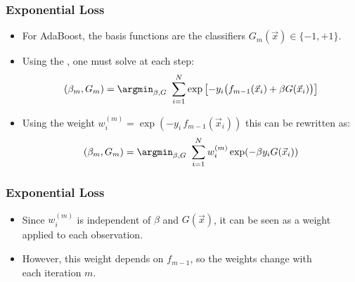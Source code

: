 \begin{frame}
  \frametitle{Exponential Loss \cont}


  \begin{itemize}
    \item For AdaBoost, the basis functions are the classifiers $G_m(\vec x) \in \{-1,+1\}$. %
    \item Using the , one must solve at each step:
      \begin{eqnarray*}
        (\beta_m, G_m) = \argmin_{\beta, G} ~\sum_{i=1}^N \exp \left[ -y_i \big(f_{m-1}(\vec{x}_i) + \beta G(\vec{x}_i)\big) \right]
      \end{eqnarray*}
    \item Using the weight $w_i^{(m)} = \exp(-y_i \, f_{m-1}(\vec{x}_i))$ this can be rewritten as:
      \begin{eqnarray*}
        (\beta_m, G_m) = \argmin_{\beta, G} ~\sum_{i=1}^N w_i^{(m)} \exp (-\beta y_i G(\vec{x}_i))
      \end{eqnarray*}
  \end{itemize}
\end{frame}


\begin{frame}
  \frametitle{Exponential Loss \cont}


  \begin{itemize}
    \item Since $w_i^{(m)}$ is independent of $\beta$ and $G(\vec x)$, it can be seen as a weight applied to each observation. %
    \item However, this weight depends on $f_{m-1}$, so the weights change with \\
      each iteration $m$.
  \end{itemize}
\end{frame}


